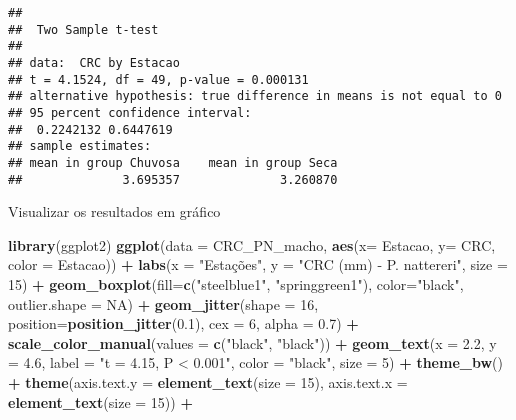 \documentclass[
]{book}
\newenvironment{Shaded}{\begin{snugshade}}{\end{snugshade}}
\newcommand{\DataTypeTok}[1]{\textcolor[rgb]{0.13,0.29,0.53}{#1}}
\newcommand{\DecValTok}[1]{\textcolor[rgb]{0.00,0.00,0.81}{#1}}
\newcommand{\FloatTok}[1]{\textcolor[rgb]{0.00,0.00,0.81}{#1}}
\newcommand{\KeywordTok}[1]{\textcolor[rgb]{0.13,0.29,0.53}{\textbf{#1}}}
\newcommand{\NormalTok}[1]{#1}
\newcommand{\OperatorTok}[1]{\textcolor[rgb]{0.81,0.36,0.00}{\textbf{#1}}}
\newcommand{\OtherTok}[1]{\textcolor[rgb]{0.56,0.35,0.01}{#1}}
\newcommand{\StringTok}[1]{\textcolor[rgb]{0.31,0.60,0.02}{#1}}
\begin{document}
\begin{verbatim}
## 
## 	Two Sample t-test
## 
## data:  CRC by Estacao
## t = 4.1524, df = 49, p-value = 0.000131
## alternative hypothesis: true difference in means is not equal to 0
## 95 percent confidence interval:
##  0.2242132 0.6447619
## sample estimates:
## mean in group Chuvosa    mean in group Seca 
##              3.695357              3.260870
\end{verbatim}

Visualizar os resultados em gráfico

\begin{Shaded}
\begin{Highlighting}[]
\KeywordTok{library}\NormalTok{(ggplot2)}
\KeywordTok{ggplot}\NormalTok{(}\DataTypeTok{data =}\NormalTok{ CRC_PN_macho, }\KeywordTok{aes}\NormalTok{(}\DataTypeTok{x=}\NormalTok{ Estacao, }\DataTypeTok{y=}\NormalTok{ CRC, }\DataTypeTok{color =}\NormalTok{ Estacao)) }\OperatorTok{+}\StringTok{ }
\StringTok{  }\KeywordTok{labs}\NormalTok{(}\DataTypeTok{x =} \StringTok{"Estações"}\NormalTok{, }\DataTypeTok{y =} \StringTok{"CRC (mm) - P. nattereri"}\NormalTok{, }\DataTypeTok{size =} \DecValTok{15}\NormalTok{) }\OperatorTok{+}
\StringTok{  }\KeywordTok{geom_boxplot}\NormalTok{(}\DataTypeTok{fill=}\KeywordTok{c}\NormalTok{(}\StringTok{"steelblue1"}\NormalTok{, }\StringTok{"springgreen1"}\NormalTok{), }\DataTypeTok{color=}\StringTok{"black"}\NormalTok{, }\DataTypeTok{outlier.shape =} \OtherTok{NA}\NormalTok{) }\OperatorTok{+}
\StringTok{  }\KeywordTok{geom_jitter}\NormalTok{(}\DataTypeTok{shape =} \DecValTok{16}\NormalTok{, }\DataTypeTok{position=}\KeywordTok{position_jitter}\NormalTok{(}\FloatTok{0.1}\NormalTok{), }\DataTypeTok{cex =} \DecValTok{6}\NormalTok{, }\DataTypeTok{alpha =} \FloatTok{0.7}\NormalTok{) }\OperatorTok{+}
\StringTok{  }\KeywordTok{scale_color_manual}\NormalTok{(}\DataTypeTok{values =} \KeywordTok{c}\NormalTok{(}\StringTok{"black"}\NormalTok{, }\StringTok{"black"}\NormalTok{)) }\OperatorTok{+}
\StringTok{  }\KeywordTok{geom_text}\NormalTok{(}\DataTypeTok{x =} \FloatTok{2.2}\NormalTok{, }\DataTypeTok{y =} \FloatTok{4.6}\NormalTok{, }\DataTypeTok{label =} \StringTok{"t = 4.15, P < 0.001"}\NormalTok{, }\DataTypeTok{color =} \StringTok{"black"}\NormalTok{, }\DataTypeTok{size =} \DecValTok{5}\NormalTok{) }\OperatorTok{+}
\StringTok{  }\KeywordTok{theme_bw}\NormalTok{() }\OperatorTok{+}
\StringTok{  }\KeywordTok{theme}\NormalTok{(}\DataTypeTok{axis.text.y =} \KeywordTok{element_text}\NormalTok{(}\DataTypeTok{size =} \DecValTok{15}\NormalTok{), }\DataTypeTok{axis.text.x =} \KeywordTok{element_text}\NormalTok{(}\DataTypeTok{size =} \DecValTok{15}\NormalTok{)) }\OperatorTok{+}

\end{Highlighting}
\end{Shaded}
\end{document}
